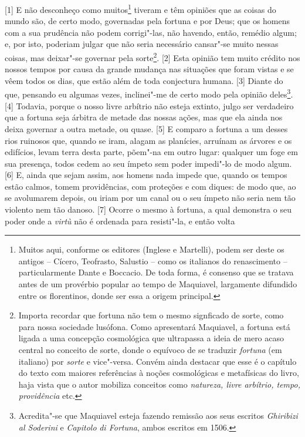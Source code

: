 {[}1{]} E não desconheço como muitos\footnote{Muitos aqui, conforme os
  editores (Inglese e Martelli), podem ser deste os antigos -- Cícero,
  Teofrasto, Salustio -- como os italianos do renascimento --
  particularmente Dante e Boccacio. De toda forma, é consenso que se
  tratava antes de um provérbio popular ao tempo de Maquiavel,
  largamente difundido entre os florentinos, donde ser essa a origem
  principal.} tiveram e têm opiniões que as coisas do mundo são, de
certo modo, governadas pela fortuna e por Deus; que os homens com a sua
prudência não podem corrigi"-las, não havendo, então, remédio algum; e,
por isto, poderiam julgar que não seria necessário cansar"-se muito
nessas coisas, mas deixar"-se governar pela sorte\footnote{Importa
  recordar que fortuna não tem o mesmo signficado de sorte, como para
  nossa sociedade
  lusófona. Como apresentará Maquiavel, a fortuna está ligada a uma
  concepção cosmológica que ultrapassa a ideia de mero acaso central no
  conceito de sorte, donde o equívoco de se traduzir \emph{fortuna} (em
  italiano) por \emph{sorte} e vice"-versa. Convém ainda destacar que
  esse é o capítulo do texto com maiores referências à noções
  cosmológicas e metafísicas do livro, haja vista que o autor mobiliza
  conceitos como \emph{natureza, livre arbítrio, tempo, providência}
  etc.}. {[}2{]} Esta opinião tem muito crédito nos nossos tempos por
causa da grande mudança nas situações que foram vistas e se vêem todos
os dias, que estão além de toda conjectura humana. {[}3{]} Diante do
que, pensando eu algumas vezes, inclinei"-me de certo modo pela opinião
deles\footnote{Acredita"-se que Maquiavel esteja fazendo remissão aos
  seus escritos \emph{Ghiribizi al Soderini} e \emph{Capitolo}
  \emph{di Fortuna}, ambos escritos em 1506.}. {[}4{]} Todavia, porque o
nosso livre arbítrio não esteja extinto, julgo ser verdadeiro que a
fortuna seja árbitra de metade das nossas ações, mas que ela ainda nos
deixa governar a outra metade, ou quase. {[}5{]} E comparo a fortuna a
um desses rios ruinosos que, quando se iram, alagam as planícies,
arruínam as árvores e os edifícios, levam terra desta parte, põem"-na em
outro lugar: qualquer um foge em sua presença, todos cedem ao seu ímpeto
sem poder impedi"-lo de modo algum. {[}6{]} E, ainda que sejam assim, aos
homens nada impede que, quando os tempos estão calmos, tomem
providências, com proteções e com diques: de modo que, ao se avolumarem
depois, ou iriam por um canal ou o seu ímpeto não seria nem tão violento
nem tão danoso. {[}7{]} Ocorre o mesmo à fortuna, a qual demonstra o seu
poder onde a \emph{virtù} não é ordenada para resisti"-la, e então volta
